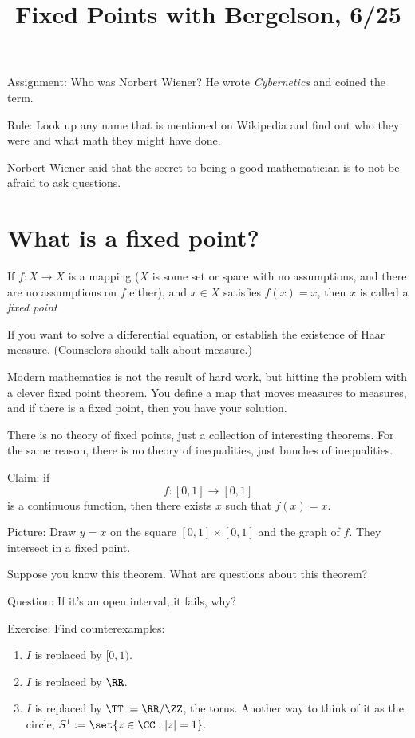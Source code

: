 \documentclass{article}
\title{Fixed Points with Bergelson, 6/25}
\begin{document}
\maketitle

Assignment: Who was Norbert Wiener? He wrote \emph{Cybernetics} and coined the term.

Rule: Look up any name that is mentioned on Wikipedia and find out who they were and what 
math they might have done.

Norbert Wiener said that the secret to being a good mathematician is to not be afraid 
to ask questions. 

\section{What is a fixed point?}

\begin{definition}
If $f:X\to X$ is a mapping ($X$ is some set or space with no assumptions,
and there are no assumptions on $f$ either),
and $x\in X$ satisfies $f(x)=x$, then $x$ is called a \emph{fixed point}
\end{definition}

If you want to solve a differential equation, or establish the existence of Haar measure.
(Counselors should talk about measure.)

Modern mathematics is not the result of hard work, but hitting the problem with a clever fixed point
theorem. You define a map that moves measures to measures, and if there is a fixed point, then you
have your solution.

There is no theory of fixed points, just a collection of interesting theorems. For the same reason,
there is no theory of inequalities, just bunches of inequalities.

\begin{proposition}
    Claim: if \[ f:[0,1] \to [0,1] \]
    is a continuous function, then there exists
    $x$ such that $f(x)=x$.
\end{proposition}

Picture: Draw $y=x$ on the square $[0,1]\times [0,1]$ and the graph of $f$. 
They intersect in a fixed point.

Suppose you know this theorem. What are questions about this theorem?

Question: If it's an open interval, it fails, why?

Exercise: Find counterexamples: 
\begin{enumerate}[1.]
        \item $I$ is replaced by $[0,1)$.
        \item $I$ is replaced by $\RR$.
        \item $I$ is replaced by $\TT:=\RR/\ZZ$, the torus. Another way to think of it
          as the circle, $S^1:=\set{z\in\CC : |z| = 1}$. 
\end{enumerate}
\end{document}
